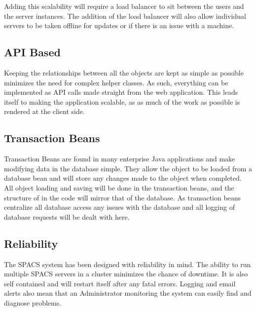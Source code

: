 \par
Adding this scalability will require a load balancer to sit between the users and the server instances. The addition of the load balancer will also allow individual servers to be taken offline for updates or if there is an issue with a machine.

\subsection{API Based}
\par
Keeping the relationships between all the objects are kept as simple as possible minimizes the need for complex helper classes. As such, everything can be implemented as API calls made straight from the web application. This leads itself to making the application scalable, as as much of the work as possible is rendered at the client side.

\subsection{Transaction Beans}
\par
Transaction Beans are found in many enterprise Java applications and make modifying data in the database simple. They allow the object to be loaded from a database bean and will store any changes made to the object when completed. All object loading and saving will be done in the transaction beans, and the structure of in the code will mirror that of the database. As transaction beans centralize all database access any issues with the database and all logging of database requests will be dealt with here.

\subsection{Reliability}
\par
The SPACS system has been designed with reliability in mind. The ability to run multiple SPACS servers in a cluster minimizes the chance of downtime. It is also self contained and will restart itself after any fatal errors. Logging and email alerts also mean that an Administrator monitoring the system can easily find and diagnose problems.


